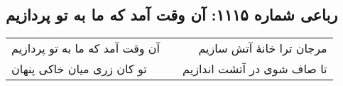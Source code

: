 \begin{center}
\section*{رباعی شماره ۱۱۱۵: آن وقت آمد که ما به تو پردازیم}
\label{sec:1115}
\begin{longtable}{l p{0.5cm} r}
آن وقت آمد که ما به تو پردازیم
&&
مرجان ترا خانهٔ آتش سازیم
\\
تو کان زری میان خاکی پنهان
&&
تا صاف شوی در آتشت اندازیم
\\
\end{longtable}
\end{center}
